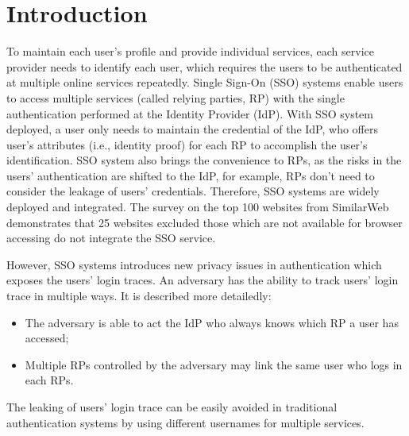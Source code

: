 \section{Introduction}
\label{sec:intro}


To maintain each user's profile and provide individual services, each service provider needs to identify each user, which requires the users to be authenticated at multiple online services repeatedly. 
Single Sign-On (SSO) systems enable users to access multiple services (called relying parties, RP) with the single authentication performed at the Identity Provider (IdP). With SSO system deployed, a user only needs to maintain the credential of the IdP, who offers user's attributes (i.e., identity proof) for each RP to accomplish the user's identification. 
SSO system also brings the convenience to RPs, as the risks in the users' authentication are shifted to the IdP, for example, RPs don't need to consider the leakage of users' credentials. 
Therefore, SSO systems are widely deployed and integrated. 
The survey on the top 100 websites from SimilarWeb~\cite{similarweb} demonstrates that 25 websites excluded those which are not available for browser accessing do not integrate the SSO service.

However, SSO systems introduces new privacy issues in authentication which exposes the users' login traces. An adversary has the ability to track users' login trace in multiple ways. It is described more detailedly:
\begin{itemize}
\item The adversary is able to act the IdP who always knows which RP a user has accessed; 
\item Multiple RPs controlled by the adversary may link the same user who logs in each RPs.
\end{itemize}
 
The leaking of users' login trace can be easily avoided in traditional authentication systems by using different usernames for multiple services. 

